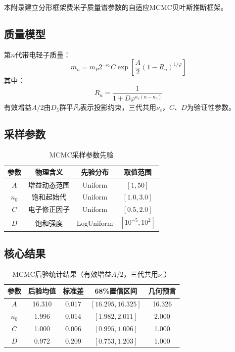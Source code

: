 \documentclass[12pt,a4paper,twocolumn]{article}
\renewcommand{\phi}{\varphi}
\begin{document}
本附录建立分形框架费米子质量谱参数的自适应MCMC贝叶斯推断框架。

\subsection{质量模型}
第$n$代带电轻子质量：
\[
m_n = m_P 2^{-\nu_e} C \exp\left[\frac{A}{2}(1-R_n)^{1/\phi}\right]
\]
其中：
\[
R_n = \frac{1}{1+D\phi^{\kappa_s(n-n_0)}}
\]
有效增益$A/2$由$D_5$群平凡表示投影约束，三代共用$\nu_e$，$C$、$D$为验证性参数。

\subsection{采样参数}
\begin{table}[H]
\centering
\footnotesize
\caption{MCMC采样参数先验}
\begin{tabular}{c|c|c|c}
\hline
\textbf{参数} & \textbf{物理含义} & \textbf{先验分布} & \textbf{取值范围} \\
\hline
$A$ & 增益动态范围 & Uniform & $[1,50]$ \\
$n_0$ & 饱和起始代 & Uniform & $[1.0,3.0]$ \\
$C$ & 电子修正因子 & Uniform & $[0.5,2.0]$ \\
$D$ & 饱和强度 & LogUniform & $[10^{-5},10^2]$ \\
\hline
\end{tabular}
\end{table}

\subsection{核心结果}
\begin{table}[H]
\centering
\footnotesize
\caption{MCMC后验统计结果（有效增益$A/2$，三代共用$\nu_e$）}
\begin{tabular}{c|c|c|c|c}
\hline
\textbf{参数} & \textbf{后验均值} & \textbf{标准差} & \textbf{68\%置信区间} & \textbf{几何预言} \\
\hline
$A$ & 16.310 & 0.017 & $[16.295,16.325]$ & 16.326 \\
$n_0$ & 1.996 & 0.014 & $[1.982,2.011]$ & 2.000 \\
$C$ & 1.000 & 0.006 & $[0.995,1.006]$ & 1.000 \\
$D$ & 0.972 & 0.209 & $[0.753,1.203]$ & 1.000 \\
\hline
\end{tabular}
\end{table}
\end{document}

